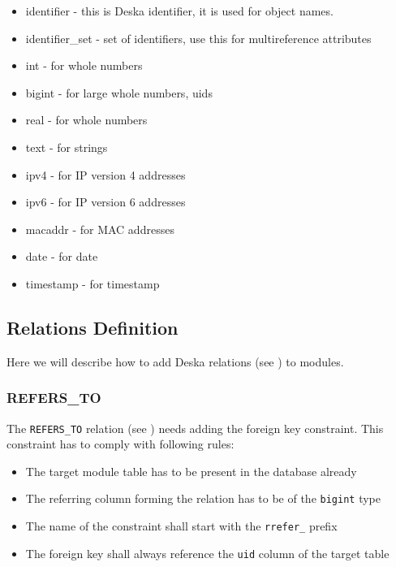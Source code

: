 \documentclass[deska]{subfiles}
\begin{document}
\begin{itemize}
	\item{identifier} - this is Deska identifier, it is used for object names.
	\item{identifier\_set} - set of identifiers, use this for multireference attributes
	\item{int} - for whole numbers
	\item{bigint} - for large whole numbers, uids
	\item{real} - for whole numbers
	\item{text} - for strings
	\item{ipv4} - for IP version 4 addresses
	\item{ipv6} - for IP version 6 addresses
	\item{macaddr} - for MAC addresses
	\item{date} - for date
	\item{timestamp} - for timestamp
\end{itemize}

\subsection{Relations Definition}
Here we will describe how to add Deska relations (see ) to modules.


\subsubsection{REFERS\_TO}
\label{sec:db-scheme-refers-to}

The {\tt REFERS\_TO} relation (see ) needs adding the foreign key constraint. This constraint has to comply with following rules:

\begin{itemize}
    \item The target module table has to be present in the database already
    \item The referring column forming the relation has to be of the {\tt bigint} type
    \item The name of the constraint shall start with the {\tt rrefer\_} prefix
    \item The foreign key shall always reference the {\tt uid} column of the target table
\end{itemize}
\end{document}
